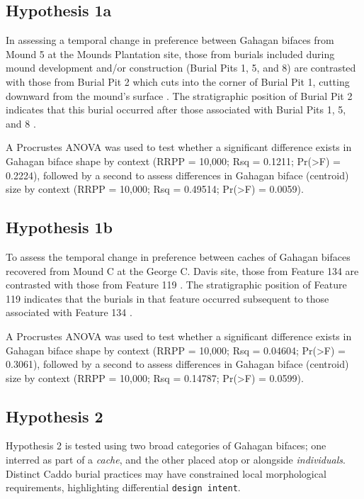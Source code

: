 \documentclass[]{interact}
\theoremstyle{plain}%
\theoremstyle{definition}
\theoremstyle{remark}
\begin{document}
\hypertarget{hypothesis-1a}{%
\subsection{Hypothesis 1a}\label{hypothesis-1a}}

In assessing a temporal change in preference between Gahagan bifaces
from Mound 5 at the Mounds Plantation site, those from burials included
during mound development and/or construction (Burial Pits 1, 5, and 8)
are contrasted with those from Burial Pit 2 which cuts into the corner
of Burial Pit 1, cutting downward from the mound's surface
\citep{RN8174}. The stratigraphic position of Burial Pit 2 indicates
that this burial occurred after those associated with Burial Pits 1, 5,
and 8 \citep{RN8174}.

A Procrustes ANOVA was used to test whether a significant difference
exists in Gahagan biface shape by context (RRPP = 10,000; Rsq = 0.1211;
Pr(\textgreater F) = 0.2224), followed by a second to assess differences
in Gahagan biface (centroid) size by context (RRPP = 10,000; Rsq =
0.49514; Pr(\textgreater F) = 0.0059).

\hypertarget{hypothesis-1b}{%
\subsection{Hypothesis 1b}\label{hypothesis-1b}}

To assess the temporal change in preference between caches of Gahagan
bifaces recovered from Mound C at the George C. Davis site, those from
Feature 134 are contrasted with those from Feature 119
\citep{RN5746,RN8186}. The stratigraphic position of Feature 119
indicates that the burials in that feature occurred subsequent to those
associated with Feature 134 \citep{RN5746,RN8186}.

A Procrustes ANOVA was used to test whether a significant difference
exists in Gahagan biface shape by context (RRPP = 10,000; Rsq = 0.04604;
Pr(\textgreater F) = 0.3061), followed by a second to assess differences
in Gahagan biface (centroid) size by context (RRPP = 10,000; Rsq =
0.14787; Pr(\textgreater F) = 0.0599).

\hypertarget{hypothesis-2-1}{%
\subsection{Hypothesis 2}\label{hypothesis-2-1}}

Hypothesis 2 is tested using two broad categories of Gahagan bifaces;
one interred as part of a \emph{cache}, and the other placed atop or
alongside \emph{individuals}. Distinct Caddo burial practices may have
constrained local morphological requirements, highlighting differential
\texttt{design\ intent}.
\end{document}
